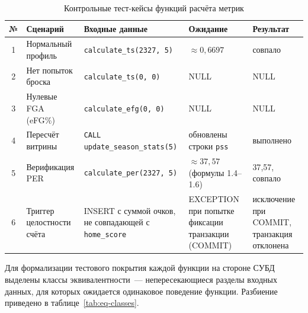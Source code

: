 {\footnotesize\setlength{\tabcolsep}{3pt}\renewcommand{\arraystretch}{1.2}
\begin{table}[H]
\caption{Контрольные тест-кейсы функций расчёта метрик}
\label{tab:test-cases}
\centering
\begin{tabular}{|c|p{}|p{}|p{}|p{}|}
\hline
\textbf{№} & \textbf{Сценарий} & \textbf{Входные данные}
  & \textbf{Ожидание} & \textbf{Результат} \\
\hline
1 & Нормальный профиль & \texttt{calculate\_ts(2327, 5)}
  & $\approx 0{,}6697$ & совпало \\
\hline
2 & Нет попыток броска & \texttt{calculate\_ts(0, 0)}
  & NULL & NULL \\
\hline
3 & Нулевые FGA (eFG\%) & \texttt{calculate\_efg(0, 0)}
  & NULL & NULL \\
\hline
4 & Пересчёт витрины & \texttt{CALL update\_season\_stats(5)}
  & обновлены строки \texttt{pss} & выполнено \\
\hline
5 & Верификация PER & \texttt{calculate\_per(2327, 5)}
  & $\approx 37{,}57$ (формулы 1.4--1.6) & 37{,}57, совпало \\
\hline
6 & Триггер целостности счёта & INSERT с суммой очков,
  не совпадающей с \texttt{home\_score}
  & EXCEPTION при попытке фиксации транзакции (COMMIT) & исключение при COMMIT,
  транзакция отклонена \\
\hline
\end{tabular}
\end{table}
}

Для формализации тестового покрытия каждой функции на стороне СУБД
выделены классы эквивалентности~--- непересекающиеся разделы входных
данных, для которых ожидается одинаковое поведение функции. Разбиение
приведено в таблице~\ref{tab:eq-classes}.

